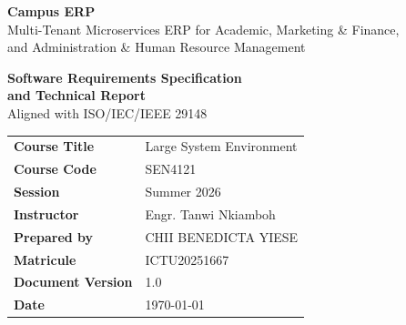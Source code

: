 \documentclass[11pt,a4paper]{article}
\title{\vspace{-2em}}
\date{}
\author{}
\begin{document}
\begin{titlepage}
  \vspace{1.0cm}
  \begin{center}
    {\color{white}\Huge\bfseries Campus ERP}\\[6pt]
    {\color{white}\large Multi-Tenant Microservices ERP for Academic, Marketing \& Finance,\\ and Administration \& Human Resource Management}
  \end{center}
  \vspace{2.6cm}
  \begin{center}
    {\Large\bfseries\color{ceTealDark} Software Requirements Specification\\ and Technical Report}\\[4pt]
    {\normalsize\color{ceMuted} Aligned with ISO/IEC/IEEE 29148}
  \end{center}

  \vspace{2.0cm}
  \begin{center}
  \renewcommand{\arraystretch}{1.5}
  \begin{tabular}{L{4.2cm}L{8.5cm}}
    \thd{}\textbf{\color{ceTealDark}Course Title} & Large System Environment \\
    \textbf{\color{ceTealDark}Course Code} & SEN4121 \\
    \textbf{\color{ceTealDark}Session} & Summer 2026 \\
    \textbf{\color{ceTealDark}Instructor} & Engr. Tanwi Nkiamboh \\
    \textbf{\color{ceTealDark}Prepared by} & CHII BENEDICTA YIESE \\
    \textbf{\color{ceTealDark}Matricule} & ICTU20251667 \\
    \textbf{\color{ceTealDark}Document Version} & 1.0 \\
    \textbf{\color{ceTealDark}Date} & \today \\
  \end{tabular}
  \end{center}

  \vfill
  \restoregeometry
\end{titlepage}

\tableofcontents
\clearpage
\listoffigures
\clearpage
\listoftables
\clearpage
{}












\appendix

\end{document}

